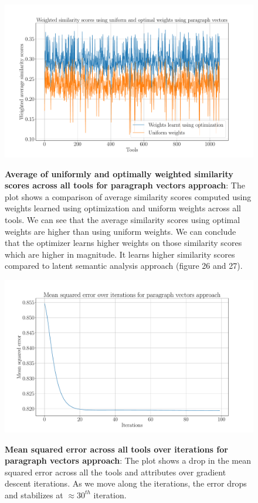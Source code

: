 \begin{figure}[h]
\begin{centering}
    {\includegraphics[scale=0.37]{figures/weighted_optimal_uniform_scores_pv.pdf}}
    \caption[Average of uniformly and optimally weighted similarity scores across all tools for paragraph vectors approach]{\textbf{Average of uniformly and optimally weighted similarity scores across all tools for paragraph vectors approach}: The plot shows a comparison of average similarity scores computed using weights learned using optimization and uniform weights across all tools. We can see that the average similarity scores using optimal weights are higher than using uniform weights. We can conclude that the optimizer learns higher weights on those similarity scores which are higher in magnitude. It learns higher similarity scores compared to latent semantic analysis approach (figure 26 and 27).}
\end{centering}
\end{figure}

\begin{figure}[h]
\begin{centering}
    {\includegraphics[scale=0.37]{figures/MSE_iterations_PV.pdf}}
    \caption[Mean squared error across all tools over iterations for paragraph vectors approach]{\textbf{Mean squared error across all tools over iterations for paragraph vectors approach}: The plot shows a drop in the mean squared error across all the tools and attributes over gradient descent iterations. As we move along the iterations, the error drops and stabilizes at $\approx30^{th}$ iteration.}
\end{centering}
\end{figure}


